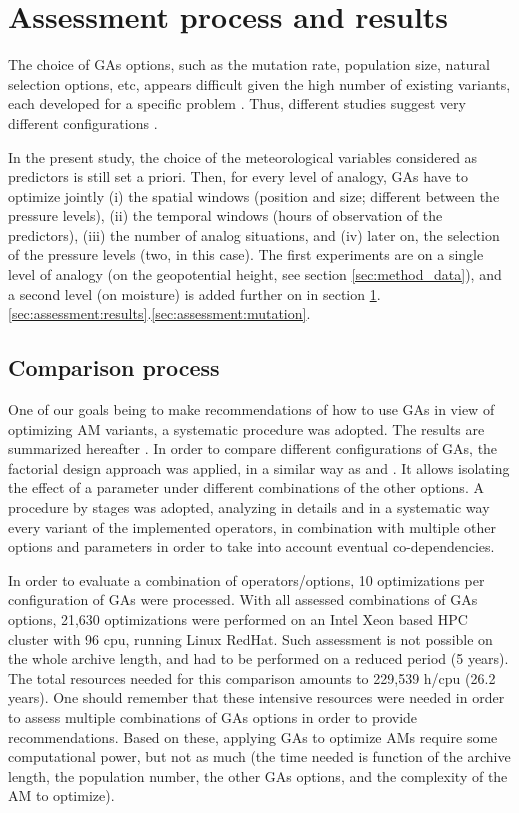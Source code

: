 \documentclass{ametsoc}
\begin{document}
\section{Assessment process and results}
\label{sec:assessment}

The choice of GAs options, such as the mutation rate, population size, natural selection options, etc, appears difficult given the high number of existing variants, each developed for a specific problem \citep{Haupt2004, Costa2007a}. Thus, different studies suggest very different configurations \citep{DeJong1975a, Grefenstette1986, Back1996a, Back1996b}.

In the present study, the choice of the meteorological variables considered as predictors is still set a priori. Then, for every level of analogy, GAs have to optimize jointly (i) the spatial windows (position and size; different between the pressure levels), (ii) the temporal windows (hours of observation of the predictors), (iii) the number of analog situations, and (iv) later on, the selection of the pressure levels (two, in this case). The first experiments are on a single level of analogy (on the geopotential height, see section \ref{sec:method_data}), and a second level (on moisture) is added further on in section \ref{sec:assessment}.\ref{sec:assessment:results}.\ref{sec:assessment:mutation}.


\subsection{Comparison process}

One of our goals being to make recommendations of how to use GAs in view of optimizing AM variants, a systematic procedure was adopted. The results are summarized hereafter \citep[see][for the details]{Horton2012a}. In order to compare different configurations of GAs, the factorial design approach was applied, in a similar way as \citet{Costa2005a,Costa2007a} and \citet{Mariano2010a}. It allows isolating the effect of a parameter under different combinations of the other options. A procedure by stages was adopted, analyzing in details and in a systematic way every variant of the implemented operators, in combination with multiple other options and parameters in order to take into account eventual co-dependencies.

In order to evaluate a combination of operators/options, 10 optimizations per configuration of GAs were processed. With all assessed combinations of GAs options, 21,630 optimizations were performed on an Intel Xeon based HPC cluster with 96 cpu, running Linux RedHat. Such assessment is not possible on the whole archive length, and had to be performed on a reduced period (5 years). The total resources needed for this comparison amounts to 229,539 h/cpu (26.2 years). One should remember that these intensive resources were needed in order to assess multiple combinations of GAs options in order to provide recommendations. Based on these, applying GAs to optimize AMs require some computational power, but not as much (the time needed is function of the archive length, the population number, the other GAs options, and the complexity of the AM to optimize). 
\end{document}

